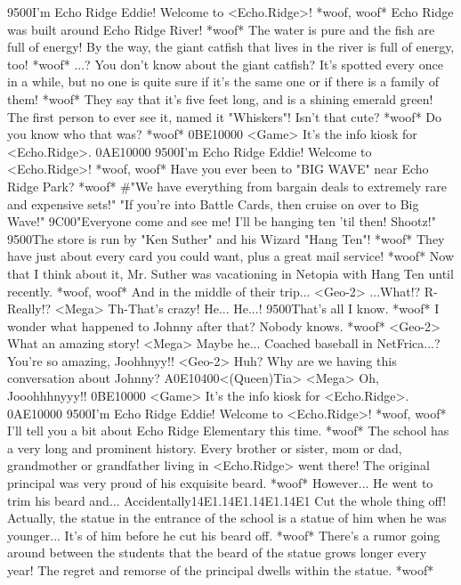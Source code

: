 {95}{00}I'm Echo Ridge Eddie! Welcome to <Echo.Ridge>! 
*woof, woof* 
Echo Ridge was built around Echo Ridge River! *woof* 
The water is pure and the fish are full of energy! 
By the way, the giant catfish that lives in the river is full of energy, too! 
*woof* ...? You don't know about the giant catfish? 
It's spotted every once in a while, but no one is quite 
sure if it's the same one or if there is a family of them! 
*woof* They say that it's five feet long, and is a shining emerald green! 
The first person to ever see it, named it "Whiskers"! Isn't that cute? *woof* 
Do you know who that was? *woof* 
{0B}{E1}{00}{00}
<Game> It's the info kiosk for <Echo.Ridge>. 
{0A}{E1}{00}{00} 
{95}{00}I'm Echo Ridge Eddie! Welcome to <Echo.Ridge>! 
*woof, woof* 
Have you ever been to "BIG WAVE" near Echo Ridge Park? *woof* 
#"We have everything from bargain deals to extremely rare and expensive sets!" 
"If you're into Battle Cards, then cruise on over to Big Wave!" 
{9C}{00}"Everyone come and see me! I'll be hanging ten 'til then! Shootz!" 
{95}{00}The store is run by "Ken Suther" and his Wizard "Hang Ten"! *woof* 
They have just about every card you could want, plus a great mail service! *woof* 
Now that I think about it, Mr. Suther was vacationing 
in Netopia with Hang Ten until recently. *woof, woof* 
And in the middle of their trip... 
<Geo-2> ...What!? R-Really!? 
<Mega> Th-That's crazy! He... He...! 
{95}{00}That's all I know. *woof* 
I wonder what happened to Johnny after that? Nobody knows. *woof* 
<Geo-2> What an amazing story! 
<Mega> Maybe he... 
Coached baseball in NetFrica...? 
You're so amazing, Joohhnyy!! 
<Geo-2> Huh? Why are we having this conversation about Johnny? 
{A0}{E1}{04}{00}<(Queen)Tia> 
<Mega> Oh, Jooohhhnyyy!! 
{0B}{E1}{00}{00}
<Game> It's the info kiosk for <Echo.Ridge>. 
{0A}{E1}{00}{00} 
{95}{00}I'm Echo Ridge Eddie! Welcome to <Echo.Ridge>! 
*woof, woof* 
I'll tell you a bit about Echo Ridge Elementary this time. *woof* 
The school has a very long and prominent history. 
Every brother or sister, mom or dad, grandmother 
or grandfather living in <Echo.Ridge> went there! 
The original principal was very proud of his exquisite beard. *woof* 
However... He went to trim his beard and... 
Accidentally{14}{E1}.{14}{E1}.{14}{E1}.{14}{E1} 
Cut the whole thing off! 
Actually, the statue in the entrance of the school is 
a statue of him when he was younger... 
It's of him before he cut his beard off. *woof* 
There's a rumor going around between the students that 
the beard of the statue grows longer every year! 
The regret and remorse of the principal dwells within the statue. *woof* 
